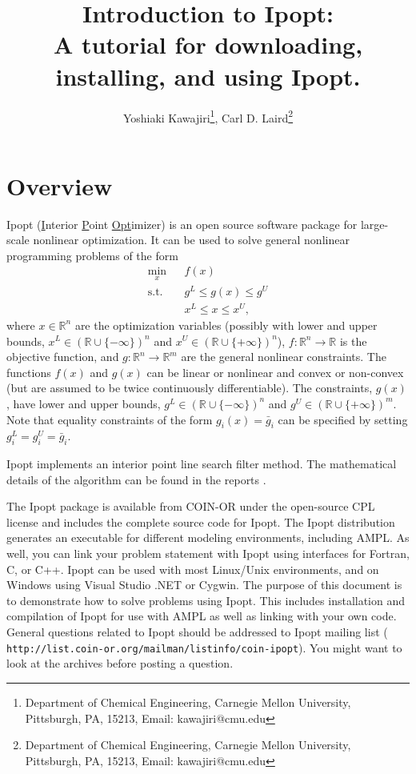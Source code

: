 \documentclass[letter,10pt]{article}
\newcommand{\RR}{{\mathbb{R}}}
\begin{document}
\title{Introduction to Ipopt:\\
A tutorial for downloading, installing, and using Ipopt.}

\author{Yoshiaki
Kawajiri\footnote{Department of Chemical Engineering, Carnegie Mellon
University, Pittsburgh, PA, 15213, Email: kawajiri@cmu.edu}, Carl
D. Laird\footnote{Department of Chemical Engineering, Carnegie Mellon
University, Pittsburgh, PA, 15213, Email: kawajiri@cmu.edu}}

\maketitle

\tableofcontents

\section{Overview}
Ipopt (\underline{I}nterior \underline{P}oint \underline{Opt}imizer) is an open
source software package for large-scale nonlinear optimization. It can
be used to solve general nonlinear programming problems of the form
\begin{eqnarray}
\min_{x} &&f(x) \label{obj} \\
\mbox{s.t.} \;  &&g^L \leq g(x) \leq g^U \\
                &&x^L \leq x \leq x^U, \label{bounds}
\end{eqnarray}
where $x \in \RR^n$ are the optimization variables (possibly with
lower and upper bounds, $x^L\in(\RR\cup\{-\infty\})^n$ and
$x^U\in(\RR\cup\{+\infty\})^n$), $f:\RR^n\longrightarrow\RR$ is the
objective function, and $g:\RR^n\longrightarrow \RR^m$ are the general
nonlinear constraints.  The functions $f(x)$ and $g(x)$ can be linear
or nonlinear and convex or non-convex (but are assumed to be twice
continuously differentiable). The constraints, $g(x)$, have lower and
upper bounds, $g^L\in(\RR\cup\{-\infty\})^n$ and
$g^U\in(\RR\cup\{+\infty\})^m$. Note that equality constraints of the
form $g_i(x)=\bar g_i$ can be specified by setting $g^L_{i}=g^U_{i}=\bar g_i$.

Ipopt implements an interior point line search filter method. The
mathematical details of the algorithm can be found in the reports
\cite{AndreasPaper} \cite{AndreasThesis}.

The Ipopt package is available from COIN-OR\cite{COINORWeb} under the
open-source CPL license and includes the complete source code for
Ipopt. The Ipopt distribution generates an executable for different
modeling environments, including AMPL. As well, you can link your
problem statement with Ipopt using interfaces for Fortran, C, or
C++. Ipopt can be used with most Linux/Unix environments, and on
Windows using Visual Studio .NET or Cygwin.  The purpose of this
document is to demonstrate how to solve problems using Ipopt. This
includes installation and compilation of Ipopt for use with AMPL as
well as linking with your own code. General questions related to Ipopt
should be addressed to Ipopt mailing list ({\tt
http://list.coin-or.org/mailman/listinfo/coin-ipopt}). You might want
to look at the archives before posting a question.
\end{document}
